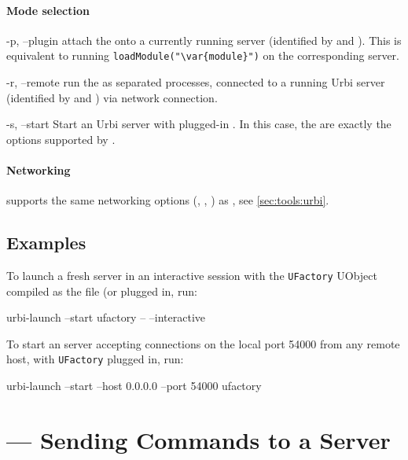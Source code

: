 \paragraph{Mode selection}
\begin{options}
\item[-p, --plugin] attach the  onto a currently running
  \urbi server (identified by  and ).  This is
  equivalent to running \lstinline|loadModule("\var{module}")| on the
  corresponding server.

\item[-r, --remote] run the  as separated processes,
  connected to a running Urbi server (identified by  and
  ) via network connection.

\item[-s, --start] Start an Urbi server with plugged-in
  .  In this case, the  are exactly
  the options supported by .
\end{options}

\paragraph{Networking}
 supports the same networking options
(, , ) as
, see \autoref{sec:tools:urbi}.

\subsection{Examples}

To launch a fresh server in an interactive session with the
\lstinline|UFactory| UObject compiled as the file 
(or  plugged in, run:

\begin{shell}
urbi-launch --start ufactory -- --interactive
\end{shell}

To start an \urbi server accepting connections on the local port 54000
from any remote host, with \lstinline|UFactory| plugged in, run:

\begin{shell}
urbi-launch --start --host 0.0.0.0 --port 54000 ufactory
\end{shell}


\section{ --- Sending \us Commands to a Server}
\label{sec:tools:urbi-send}

